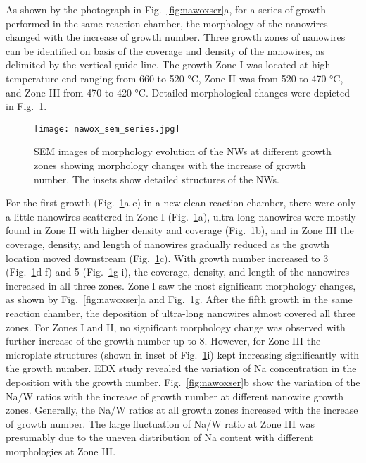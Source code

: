 As shown by the photograph in Fig.~\ref{fig:nawoxser}a, for a series of growth performed in the same reaction chamber, the morphology of the nanowires changed with the increase of growth number. Three growth zones of nanowires can be identified on basis of the coverage and density of the nanowires, as delimited by the vertical guide line. The growth Zone I was located at high temperature end ranging from 660 to 520 \si{\degreeCelsius}, Zone II was from 520 to 470 \si{\degreeCelsius}, and Zone III from 470 to 420 \si{\degreeCelsius}. Detailed morphological changes were depicted in Fig.~\ref{fig:nawoxsemall}.
\begin{figure}[htb]
\centering
\texttt{[image: nawox\_sem\_series.jpg]}
\caption[SEM images of morphology evolution]{SEM images of morphology evolution of the NWs at different growth zones showing morphology changes with the increase of growth number. The insets show detailed structures of the NWs.}
\label{fig:nawoxsemall}
\end{figure}
For the first growth (Fig.~\ref{fig:nawoxsemall}a-c) in a new clean reaction chamber, there were only a little nanowires scattered in Zone I (Fig.~\ref{fig:nawoxsemall}a), ultra-long nanowires were mostly found in Zone II with higher density and coverage (Fig.~\ref{fig:nawoxsemall}b), and in Zone III the coverage, density, and length of nanowires gradually reduced as the growth location moved downstream (Fig.~\ref{fig:nawoxsemall}c). With growth number increased to 3 (Fig.~\ref{fig:nawoxsemall}d-f) and 5 (Fig.~\ref{fig:nawoxsemall}g-i), the coverage, density, and length of the nanowires increased in all three zones. Zone I saw the most significant morphology changes, as shown by Fig.~\ref{fig:nawoxser}a and Fig.~\ref{fig:nawoxsemall}g. After the fifth growth in the same reaction chamber, the deposition of ultra-long nanowires almost covered all three zones. For Zones I and II, no significant morphology change was observed with further increase of the growth number up to 8. However, for Zone III the microplate structures (shown in inset of Fig.~\ref{fig:nawoxsemall}i) kept increasing significantly with the growth number. EDX study revealed the variation of Na concentration in the deposition with the growth number. Fig.~\ref{fig:nawoxser}b show the variation of the Na/W ratios with the increase of growth number at different nanowire growth zones. Generally, the Na/W ratios at all growth zones increased with the increase of growth number. The large fluctuation of Na/W ratio at Zone III was presumably due to the uneven distribution of Na content with different morphologies at Zone III.

